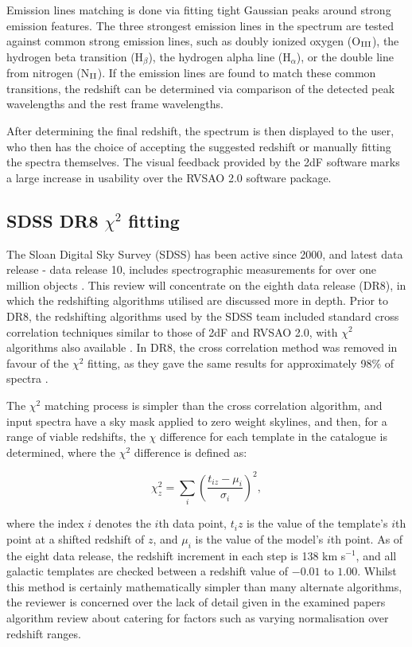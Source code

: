 \documentclass[titlesmallcaps, examinerscopy, copyrightpage]{uqthesis}
\begin{document}
Emission lines matching is done via fitting tight Gaussian peaks around strong emission features. The three strongest emission lines in the spectrum are tested against common strong emission lines, such as doubly ionized oxygen (O$_{\rm{III}}$), the hydrogen beta transition (H$_\beta$), the hydrogen alpha line (H$_\alpha$), or the double line from nitrogen (N$_{\rm{II}}$). If the emission lines are found to match these common transitions, the redshift can be determined via comparison of the detected peak wavelengths and the rest frame wavelengths.

After determining the final redshift, the spectrum is then displayed to the user, who then has the choice of accepting the suggested redshift or manually fitting the spectra themselves. The visual feedback provided by the 2dF software marks a large increase in usability over the RVSAO 2.0 software package.



\subsection{SDSS DR8 $\chi^2$ fitting}

The Sloan Digital Sky Survey (SDSS) has been active since 2000, and latest data release - data release 10, includes spectrographic measurements for over one million objects \cite{SDSSIII}. This review will concentrate on the eighth data release (DR8), in which the redshifting algorithms utilised are discussed more in depth. Prior to DR8, the redshifting algorithms used by the SDSS team included standard cross correlation techniques similar to those of 2dF and RVSAO 2.0, with $\chi^2$ algorithms also available \cite{sdss6}. In DR8, the cross correlation method was removed in favour of the $\chi^2$ fitting, as they gave the same results for approximately 98\% of spectra \cite{aihara2011eighth}.

The $\chi^2$ matching process is simpler than the cross correlation algorithm, and input spectra have a sky mask applied to zero weight skylines, and then, for a range of viable redshifts, the $\chi$ difference for each template in the catalogue is determined, where the $\chi^2$ difference is defined as:

\begin{equation}
\chi^2_z = \sum_i \left(\frac{t_{iz} - \mu_i}{\sigma_i} \right)^2,
\end{equation}

where the index $i$ denotes the $i$th data point, $t_iz$ is the value of the template's $i$th point at a shifted redshift of $z$, and $\mu_i$ is the value of the model's $i$th point. As of the eight data release, the redshift increment in each step is 138 km s$^{-1}$, and all galactic templates are checked between a redshift value of $-0.01$ to $1.00$. Whilst this method is certainly mathematically simpler than many alternate algorithms, the reviewer is concerned over the lack of detail given in the examined papers algorithm review about catering for factors such as varying normalisation over redshift ranges.
\end{document}
